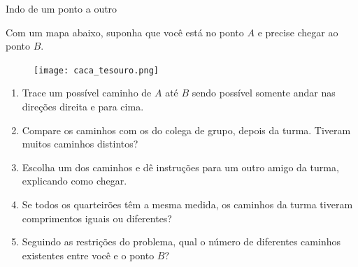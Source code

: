 \begin{task}{Indo de um ponto a outro}

Com um mapa abaixo, suponha que você está no ponto $A$ e precise chegar ao ponto $B.$ 

\begin{figure}[H]
\centering

\texttt{[image: caca\_tesouro.png]}
\end{figure}

\begin{enumerate}
\item Trace um possível caminho de $A$ até $B$ sendo possível somente andar nas  direções direita e para cima.
\item Compare os caminhos com os do colega de grupo, depois da turma. Tiveram muitos caminhos distintos?
\item Escolha um dos caminhos e dê instruções para um outro amigo da turma, explicando como chegar. 
\item Se todos os quarteirões têm a mesma medida, os caminhos da turma tiveram comprimentos iguais ou diferentes?
\item Seguindo as restrições do problema, qual o número de diferentes caminhos existentes entre você e o ponto $B?$ 

\end{enumerate} 

\end{task}
\clearpage

